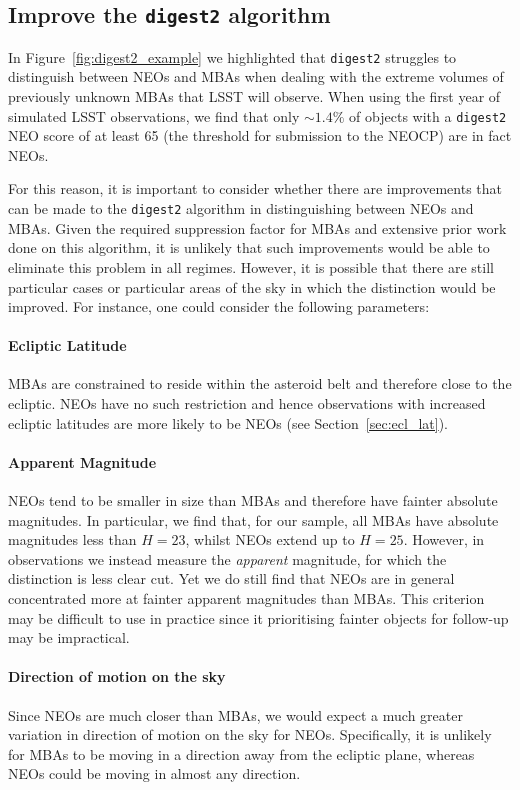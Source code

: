 \documentclass[twocolumn]{aastex631}
\newcommand{\dig}{\texttt{digest2}}
\begin{document}
\subsection{Improve the \dig{} algorithm}
In Figure~\ref{fig:digest2_example} we highlighted that \dig{} struggles to distinguish between NEOs and MBAs when dealing with the extreme volumes of previously unknown MBAs that LSST will observe. When using the first year of simulated LSST observations, we find that only ${\sim}1.4\%$ of objects with a \dig{} NEO score of at least 65 (the threshold for submission to the NEOCP) are in fact NEOs.

For this reason, it is important to consider whether there are improvements that can be made to the \dig{} algorithm in distinguishing between NEOs and MBAs. Given the required suppression factor for MBAs and extensive prior work done on this algorithm, it is unlikely that such improvements would be able to eliminate this problem in all regimes. However, it is possible that there are still particular cases or particular areas of the sky in which the distinction would be improved. For instance, one could consider the following parameters:

\paragraph{Ecliptic Latitude} MBAs are constrained to reside within the asteroid belt and therefore close to the ecliptic. NEOs have no such restriction and hence observations with increased ecliptic latitudes are more likely to be NEOs (see Section~\ref{sec:ecl_lat}).

\paragraph{Apparent Magnitude} NEOs tend to be smaller in size than MBAs and therefore have fainter absolute magnitudes. In particular, we find that, for our sample, all MBAs have absolute magnitudes less than $H=23$, whilst NEOs extend up to $H=25$. However, in observations we instead measure the \textit{apparent} magnitude, for which the distinction is less clear cut. Yet we do still find that NEOs are in general concentrated more at fainter apparent magnitudes than MBAs. This criterion may be difficult to use in practice since it prioritising fainter objects for follow-up may be impractical.

\paragraph{Direction of motion on the sky} Since NEOs are much closer than MBAs, we would expect a much greater variation in direction of motion on the sky for NEOs. Specifically, it is unlikely for MBAs to be moving in a direction away from the ecliptic plane, whereas NEOs could be moving in almost any direction.
\end{document}
